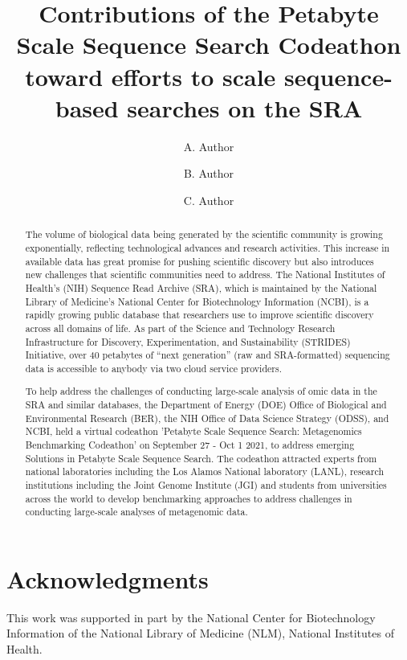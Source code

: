 \documentclass{article}
\title{Contributions of the Petabyte Scale Sequence Search Codeathon toward efforts to scale sequence-based searches on the SRA}
\author[1]{A. Author}
\author[2]{B. Author}
\author[3]{C. Author}
\affil[1,2]{Author Affiliation 1}
\affil[3]{Author Affiliation 2}
{
    \makeatletter
    \renewcommand\AB@affilsepx{: \protect\Affilfont}
    \makeatother

    \affil[ ]{Email ids}

    \makeatletter
    \renewcommand\AB@affilsepx{, \protect\Affilfont}
    \makeatother

    \affil[1]{aa@x.gov}
    \affil[2]{ba@y.gov}
    \affil[1,3]{ca@z.gov}
}
\begin{document}
\maketitle
\begin{abstract}

The volume of biological data being generated by the scientific community is growing exponentially, reflecting technological advances and research activities. This increase in available data has great promise for pushing scientific discovery but also introduces new challenges that scientific communities need to address. The National Institutes of Health’s (NIH) Sequence Read Archive (SRA), which is maintained by the National Library of Medicine’s National Center for Biotechnology Information (NCBI), is a rapidly growing public database that researchers use to improve scientific discovery across all domains of life. As part of the Science and Technology Research Infrastructure for Discovery, Experimentation, and Sustainability (STRIDES) Initiative, over 40 petabytes of “next generation” (raw and SRA-formatted) sequencing data is accessible to anybody via two cloud service providers.

To help address the challenges of conducting large-scale analysis of omic data in the SRA and similar databases, the Department of Energy (DOE) Office of Biological and Environmental Research (BER), the NIH Office of Data Science Strategy (ODSS), and NCBI, held a virtual codeathon 'Petabyte Scale Sequence Search: Metagenomics Benchmarking Codeathon' on September 27 - Oct 1 2021, to address emerging Solutions in Petabyte Scale Sequence Search. The codeathon  attracted experts from national laboratories including the Los Alamos National laboratory (LANL), research institutions including the Joint Genome Institute (JGI) and students from universities across the world to develop benchmarking approaches to address challenges in conducting large-scale analyses of metagenomic data.

\end{abstract}









\section*{Acknowledgments}
This work was supported in part by the National Center for Biotechnology Information of the National Library of Medicine (NLM), National Institutes of Health.



%  







\end{document}
